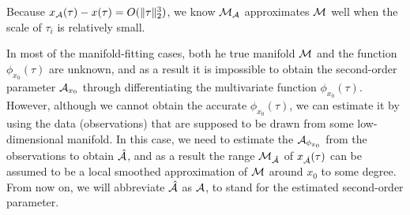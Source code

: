 \documentclass{article}
\theoremstyle{remark}
\begin{document}
Because  $x_{\cal A}(\tau)-x(\tau) = O(\|\tau\|_2^3)$, we know ${\cal M_A}$ approximates $\cal M$ well when the scale of  $\tau_i$ is relatively small.

In most of the manifold-fitting cases, both he true manifold $\cal M$ and the function $\phi_{x_0}(\tau)$ are unknown, and as a result it is impossible to obtain the second-order parameter ${\cal A}_{x_0}$ through differentiating the multivariate function $\phi_{x_0}(\tau)$.
However, although we cannot obtain the accurate $\phi_{x_0}(\tau)$, we can estimate it by using the data (observations) that are supposed to be drawn from some low-dimensional manifold. In this case, we need to estimate the ${\cal A}_{\phi_{x_0}}$ from the observations to obtain $\hat{\cal A}$, and as a result the range $\cal M_{\hat{\cal A}}$ of $x_{\hat{\cal A}}(\tau)$ can be assumed to be a local smoothed approximation of $\cal M$ around $x_0$ to some degree.
From now on, we will abbreviate $\hat{\cal A}$ as ${\cal A}$, to stand for the estimated second-order parameter.
\end{document}
